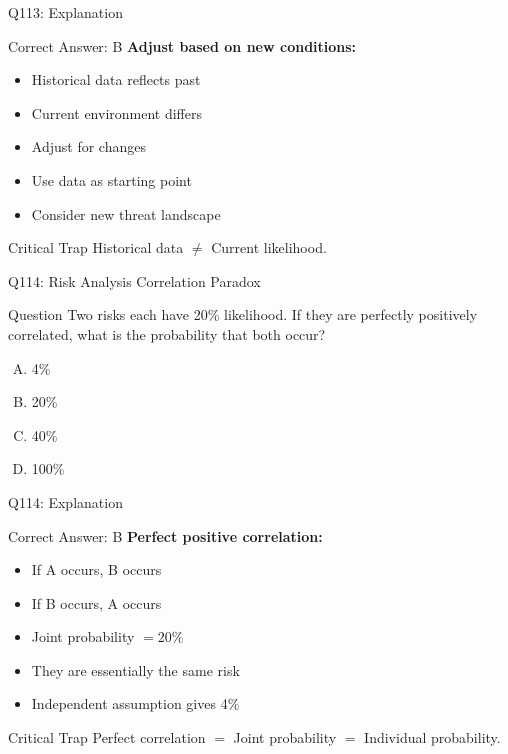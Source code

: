 \documentclass{beamer}
\begin{document}
	\begin{frame}{Q113: Explanation}
		\begin{block}{Correct Answer: B}
			\textbf{Adjust based on new conditions:}
			\begin{itemize}
				\item Historical data reflects past
				\item Current environment differs
				\item Adjust for changes
				\item Use data as starting point
				\item Consider new threat landscape
			\end{itemize}
		\end{block}
		\begin{alertblock}{Critical Trap}
			Historical data $\neq$ Current likelihood.
		\end{alertblock}
	\end{frame}
	
	\begin{frame}{Q114: Risk Analysis Correlation Paradox}
		\begin{block}{Question}
			Two risks each have 20\% likelihood. If they are perfectly positively correlated, what is the probability that both occur?
		\end{block}
		\begin{enumerate}[(A)]
			\item 4\%
			\item 20\%
			\item 40\%
			\item 100\%
		\end{enumerate}
	\end{frame}
	
	\begin{frame}{Q114: Explanation}
		\begin{block}{Correct Answer: B}
			\textbf{Perfect positive correlation:}
			\begin{itemize}
				\item If A occurs, B occurs
				\item If B occurs, A occurs
				\item Joint probability $= 20\%$
				\item They are essentially the same risk
				\item Independent assumption gives 4\%
			\end{itemize}
		\end{block}
		\begin{alertblock}{Critical Trap}
			Perfect correlation $=$ Joint probability $=$ Individual probability.
		\end{alertblock}
	\end{frame}
	
\end{document}
